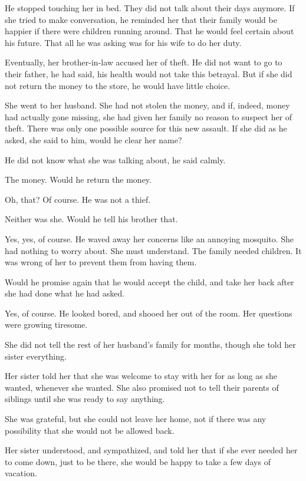 \documentclass{article}
\begin{document}
He stopped touching her in bed. They did not talk about their days anymore. If she tried to make conversation, he reminded her that their family would be happier if there were children running around. That he would feel certain about his future. That all he was asking was for his wife to do her duty. 

Eventually, her brother-in-law accused her of theft. He did not want to go to their father, he had said, his health would not take this betrayal. But if she did not return the money to the store, he would have little choice. 

She went to her husband. She had not stolen the money, and if, indeed, money had actually gone missing, she had given her family no reason to suspect her of theft. There was only one possible source for this new assault. If she did as he asked, she said to him, would he clear her name?

He did not know what she was talking about, he said calmly.

The money. Would he return the money. 

Oh, that? Of course. He was not a thief.

Neither was she. Would he tell his brother that.

Yes, yes, of course. He waved away her concerns like an annoying mosquito. She had nothing to worry about. She must understand. The family needed children. It was wrong of her to prevent them from having them.

Would he promise again that he would accept the child, and take her back after she had done what he had asked.

Yes, of course. He looked bored, and shooed her out of the room. Her questions were growing tiresome.

\vspace{.5 cm}

She did not tell the rest of her husband's family for months, though she told her sister everything. 

Her sister told her that she was welcome to stay with her for as long as she wanted, whenever she wanted. She also promised not to tell their parents of siblings until she was ready to say anything. 

She was grateful, but she could not leave her home, not if there was any possibility that she would not be allowed back.

Her sister understood, and sympathized, and told her that if she ever needed her to come down, just to be there, she would be happy to take a few days of vacation. 
\end{document}
